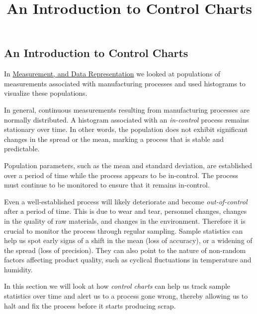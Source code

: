 \documentclass{ximera}
\author{}
\title{An Introduction to Control Charts} \license{CC BY-NC-SA 4.0}
\begin{document}
\begin{abstract}
\end{abstract}
\maketitle

\begin{onlineOnly}
\section*{An Introduction to Control Charts}
\end{onlineOnly}

In \href{https://ximera.osu.edu/qcstats/QC_stats/STAT_QC-0100/main}{Measurement, and Data Representation} we looked at populations of measurements associated with manufacturing processes and used histograms to visualize these populations. 

In general, continuous measurements resulting from manufacturing processes are normally distributed.  A histogram associated with an \emph{in-control} process remains stationary over time. In other words, the population does not exhibit significant changes in the spread or the mean, marking a process that is stable and predictable.

Population parameters, such as the mean and standard deviation, are established over a period of time while the process appears to be in-control.  The process must continue to be monitored to ensure that it remains in-control.

 Even a well-established process will likely deteriorate and become \emph{out-of-control} after a period of time.  This is due to wear and tear, personnel changes, changes in the quality of raw materials, and changes in the environment.  Therefore it is crucial to monitor the process through regular sampling.  Sample statistics can help us spot early signs of a shift in the mean (loss of accuracy), or a widening of the spread (loss of precision).  They can also point to the nature of non-random factors affecting product quality, such as cyclical fluctuations in temperature and humidity.

 In this section we will look at how \emph{control charts} can help us track sample statistics over time and alert us to a process gone wrong, thereby allowing us to halt and fix the process before it starts producing scrap.
\end{document}
